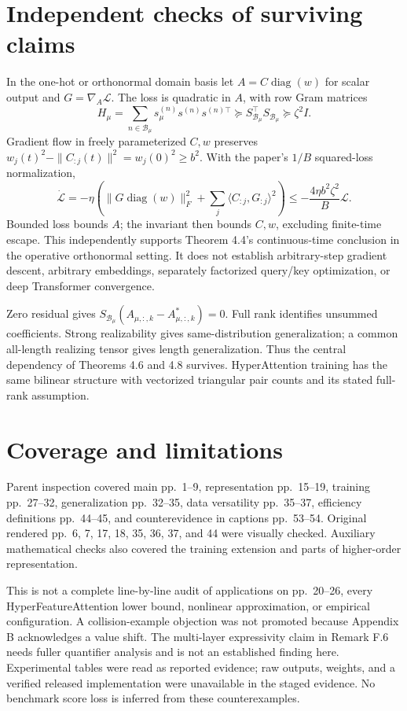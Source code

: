 \documentclass[10pt]{article}
\begin{document}
\section*{Independent checks of surviving claims}
In the one-hot or orthonormal domain basis let \(A=C\operatorname{diag}(w)\) for scalar output and \(G=\nabla_A\mathcal L\). The loss is quadratic in \(A\), with row Gram matrices \[H_\mu=\sum_{n\in\mathcal B_\mu}s_\mu^{(n)}
 s^{(n)}s^{(n)\top}
 \succeq S_{\mathcal B_\mu}^{\top}S_{\mathcal B_\mu}
 \succeq\zeta^2I.\] Gradient flow in freely parameterized \(C,w\) preserves \(w_j(t)^2-\|C_{:j}(t)\|^2=w_j(0)^2\ge b^2\). With the paper’s \(1/B\) squared-loss normalization, \[\dot{\mathcal L}
 =-\eta\left(\|G\operatorname{diag}(w)\|_F^2
 +\sum_j\langle C_{:j},G_{:j}\rangle^2\right)
 \le-\frac{4\eta b^2\zeta^2}{B}\mathcal L.\] Bounded loss bounds \(A\); the invariant then bounds \(C,w\), excluding finite-time escape. This independently supports Theorem 4.4’s continuous-time conclusion in the operative orthonormal setting. It does not establish arbitrary-step gradient descent, arbitrary embeddings, separately factorized query/key optimization, or deep Transformer convergence.\par
Zero residual gives \(S_{\mathcal B_\mu}(A_{\mu,:,k}-A^*_{\mu,:,k})=0\). Full rank identifies unsummed coefficients. Strong realizability gives same-distribution generalization; a common all-length realizing tensor gives length generalization. Thus the central dependency of Theorems 4.6 and 4.8 survives. HyperAttention training has the same bilinear structure with vectorized triangular pair counts and its stated full-rank assumption.\par
\section*{Coverage and limitations}
Parent inspection covered main pp. 1–9, representation pp. 15–19, training pp. 27–32, generalization pp. 32–35, data versatility pp. 35–37, efficiency definitions pp. 44–45, and counterevidence in captions pp. 53–54. Original rendered pp. 6, 7, 17, 18, 35, 36, 37, and 44 were visually checked. Auxiliary mathematical checks also covered the training extension and parts of higher-order representation.\par
This is not a complete line-by-line audit of applications on pp. 20–26, every HyperFeatureAttention lower bound, nonlinear approximation, or empirical configuration. A collision-example objection was not promoted because Appendix B acknowledges a value shift. The multi-layer expressivity claim in Remark F.6 needs fuller quantifier analysis and is not an established finding here. Experimental tables were read as reported evidence; raw outputs, weights, and a verified released implementation were unavailable in the staged evidence. No benchmark score loss is inferred from these counterexamples.\par
\end{document}
